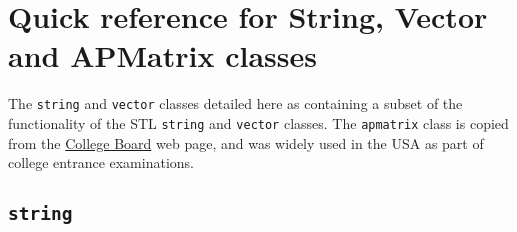 





\chapter{Quick reference for String, Vector and APMatrix classes}

The \texttt{string} and \texttt{vector} classes detailed here as containing
a subset of the functionality of the STL \texttt{string} and \texttt{vector}
classes.  The \texttt{apmatrix} class is copied from the
\href{www.collegeboard.org}{College Board} web page, and was widely used in the
USA as part of college entrance examinations.

\section{{\tt string}}


